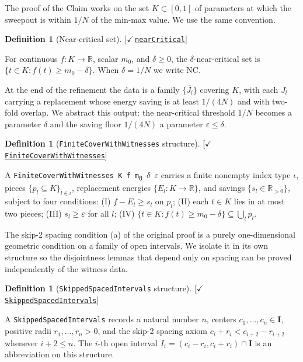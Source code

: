 \documentclass[11pt,reqno]{amsart}
\theoremstyle{definition}
\newtheorem{definition}[theorem]{Definition}
\newcommand{\unit}{\mathbf{I}}
\newcommand{\NC}{\mathrm{NC}}
\newcommand{\leanrepo}{https://github.com/MathNetwork/comb_arg/blob/v0.1.0/CombArg}
\newcommand{\leanmargin}[2]{%
  \nopagebreak\hfill{\normalfont\small\color{leangreen}%
    [\ensuremath{\checkmark}\,\href{\leanrepo/#2}{\texttt{#1}}]}\par\nopagebreak
}
\begin{document}
The proof of the Claim works on the set $K \subset [0,1]$ of
parameters at which the sweepout is within $1/N$ of the min-max
value. We use the same convention.

\begin{definition}[Near-critical set]
\label{def:NC}
\leanmargin{nearCritical}{Refinement/InitialCover.lean}
For continuous $f : K \to \mathbb{R}$, scalar $m_0$, and
$\delta \ge 0$, the $\delta$-near-critical set is
$\{t \in K : f(t) \ge m_0 - \delta\}$. When $\delta = 1/N$ we
write $\NC$.
\end{definition}

At the end of the refinement the data is a family
$\{\overline{J_l}\}$ covering $K$, with each $J_l$ carrying a
replacement whose energy saving is at least $1/(4N)$ and with
two-fold overlap. We abstract this output: the near-critical
threshold $1/N$ becomes a parameter $\delta$ and the saving floor
$1/(4N)$ a parameter $\varepsilon \le \delta$.

\begin{definition}[\texttt{FiniteCoverWithWitnesses} structure]
\label{def:ref}
\leanmargin{FiniteCoverWithWitnesses}{Core.lean}
A \texttt{FiniteCoverWithWitnesses K f m\textsubscript{0} $\delta$ $\varepsilon$}
carries a finite nonempty index type $\iota$, pieces
$\{p_l \subseteq K\}_{l \in \iota}$, replacement energies
$\{E_l : K \to \mathbb{R}\}$, and savings
$\{s_l \in \mathbb{R}_{>0}\}$, subject to four conditions:
(I) $f - E_l \ge s_l$ on $p_l$;
(II) each $t \in K$ lies in at most two pieces;
(III) $s_l \ge \varepsilon$ for all $l$;
(IV) $\{t \in K : f(t) \ge m_0 - \delta\} \subseteq \bigcup_l p_l$.
\end{definition}

The skip-2 spacing condition (a) of the original proof is a
purely one-dimensional geometric condition on a family of open
intervals. We isolate it in its own structure so the
disjointness lemmas that depend only on spacing can be proved
independently of the witness data.

\begin{definition}[\texttt{SkippedSpacedIntervals} structure]
\label{def:spaced}
\leanmargin{SkippedSpacedIntervals}{Refinement/SpacedIntervals.lean}
A \texttt{SkippedSpacedIntervals} records a natural number $n$,
centers $c_1, \ldots, c_n \in \unit$, positive radii
$r_1, \ldots, r_n > 0$, and the skip-2 spacing axiom
$c_i + r_i < c_{i+2} - r_{i+2}$ whenever $i+2 \le n$. The
$i$-th open interval $I_i = (c_i - r_i, c_i + r_i) \cap \unit$
is an abbreviation on this structure.
\end{definition}
\end{document}

